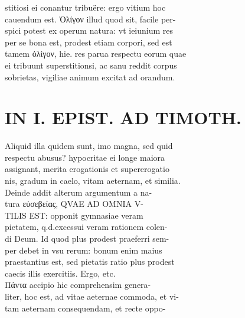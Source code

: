 \documentclass{article}
\begin{document}
\begin{pages}
                stitiosi ei conantur tribuëre: ergo vitium hoc \\
                cauendum est. Ὀλίγον illud quod sit, facile per- \\
                spici potest ex operum natura: vt ieiunium res \\
                per se bona est, prodest etiam corpori, sed est \\
                tamem ὀλίγον, hie. res parua respectu eorum quae \\
                ei tribuunt superstitionsi, ac sanu reddit corpus \\
                sobrietas, vigiliae animum excitat ad orandum. \\
                
\section*{IN I. EPIST. AD TIMOTH. \\
                }
Aliquid illa quidem sunt, imo magna, sed quid \\
                respectu abusus? hypocritae ei longe maiora \\
                assignant, merita erogationis et supererogatio \\
                nis, gradum in caelo, vitam aeternam, et similia. \\
                Deinde addit alterum argumentum a na- \\
                tura εὐσεβείας, QVAE AD OMNIA V- \\
                TILIS EST: opponit gymnasiae veram \\
                pietatem, q.d.excessui veram rationem colen- \\
                di Deum. Id quod plus prodest praeferri sem- \\
                per debet in vsu rerum: bonum enim maius \\
                praestantius est, sed pietatis ratio plus prodest \\
                caecis illis exercitiis. Ergo, etc. \\
                Πάντα accipio hic comprehensim genera- \\
                liter, hoc est, ad vitae aeternae commoda, et vi- \\
                tam aeternam consequendam, et recte oppo- \\

\end{pages}
\end{document}
